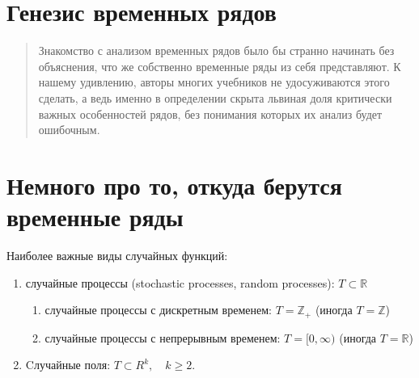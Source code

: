 \section{Генезис временных рядов}

\begin{quote}
  Знакомство с анализом временных рядов было бы странно начинать без
  объяснения, что же собственно временные ряды из себя представляют.
  К нашему удивлению, авторы многих учебников не удосуживаются этого
  сделать, а ведь именно в определении скрыта львиная доля критически важных
  особенностей рядов, без понимания которых их анализ будет ошибочным.
\end{quote}

\section*{Немного про то, откуда берутся временные ряды}


Наиболее важные виды случайных функций:
\begin{enumerate}
  \item случайные процессы (stochastic processes, random processes):
    \( T \subset \mathbb{R} \)
    \begin{enumerate}
      \item случайные процессы с дискретным временем: \( T =
        \mathbb{Z}_+ \) (иногда \( T = \mathbb{Z} \))
      \item случайные процессы с непрерывным временем: \( T = [0,
        \infty) \) (иногда \( T = \mathbb{R} \))
    \end{enumerate}
  \item Cлучайные поля: \( T \subset R^k, \quad k \geq 2 \).
\end{enumerate}


